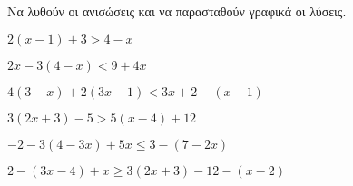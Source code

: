 Να λυθούν οι ανισώσεις και να παρασταθούν γραφικά οι λύσεις.
\begin{multicols}{2}
\begin{alist}
\item $ 2(x-1)+3>4-x $
\item $ 2x-3(4-x)<9+4x $
\item $ 4(3-x)+2(3x-1)<3x+2-(x-1) $
\item $ 3(2x+3)-5>5(x-4)+12 $
\item $ -2-3(4-3x)+5x\leq3-(7-2x) $
\item $ 2-(3x-4)+x\geq3(2x+3)-12-(x-2) $
\end{alist}
\end{multicols}
